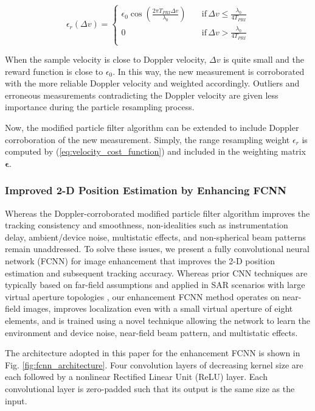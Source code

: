 \documentclass[10pt,journal,final]{IEEEtran}
\begin{document}
\begin{equation}
\label{eq:velocity_cost_function}
\epsilon_r (\Delta v)=\begin{cases}
	\epsilon_0 \cos \left(\frac{2\pi T_{PRI} \Delta v}{\lambda_0}\right) \quad &\text{if} \, \Delta v \leq \frac{\lambda_0}{4T_{PRI}} \\
	0 \quad &\text{if} \, \Delta v > \frac{\lambda_0}{4T_{PRI}} \\
	\end{cases}
\end{equation}

When the sample velocity is close to Doppler velocity, $\Delta v$ is quite small and the reward function is close to $\epsilon_0$. In this way, the new measurement is corroborated with the more reliable Doppler velocity and weighted accordingly. Outliers and erroneous measurements contradicting the Doppler velocity are given less importance during the particle resampling process. 

Now, the modified particle filter algorithm can be extended to include Doppler corroboration of the new measurement. Simply, the range resampling weight $\epsilon_r$ is computed by (\ref{eq:velocity_cost_function}) and included in the weighting matrix $\bm{\epsilon}$. 

\subsubsection{Improved 2-D Position Estimation by Enhancing FCNN}
\label{subsubsec:improved_2d_position_esitmation_by_FCNN}
Whereas the Doppler-corroborated modified particle filter algorithm improves the tracking consistency and smoothness, non-idealities such as instrumentation delay, ambient/device noise, multistatic effects, and non-spherical beam patterns remain unaddressed. To solve these issues, we present a fully convolutional neural network (FCNN) for image enhancement that improves the 2-D position estimation and subsequent tracking accuracy. Whereas prior CNN techniques are typically based on far-field assumptions and applied in SAR scenarios with large virtual aperture topologies \cite{sar_cnn:enhance1}, our enhancement FCNN method operates on near-field images, improves localization even with a small virtual aperture of eight elements, and is trained using a novel technique allowing the network to learn the environment and device noise, near-field beam pattern, and multistatic effects.

The architecture adopted in this paper for the enhancement FCNN is shown in Fig. \ref{fig:fcnn_architecture}. Four convolution layers of decreasing kernel size are each followed by a nonlinear Rectified Linear Unit (ReLU) layer. Each convolutional layer is zero-padded such that its output is the same size as the input. 
\end{document}

